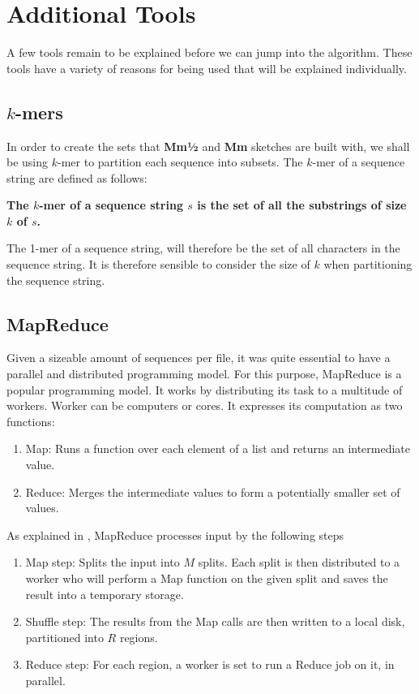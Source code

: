 \documentclass[../../main.tex]{subfiles}
\begin{document}
\section{Additional Tools}
A few tools remain to be explained before we can jump into the algorithm. These tools have a variety of reasons for being used that will be explained individually. 
\subsection{$k$-mers}
In order to create the sets that {\bf Mm½} and {\bf Mm} sketches are built with, we shall be using $k$-mer to partition each sequence into subsets. The $k$-mer of a sequence string are defined as follows:
\begin{center}
{\bf The $k$-mer of a sequence string $s$ is the set of all the substrings of size $k$ of $s$.}
\end{center}
The 1-mer of a sequence string, will therefore be the set of all characters in the sequence string. It is therefore sensible to consider the size of $k$ when partitioning the sequence string.
\subsection{MapReduce}
Given a sizeable amount of sequences per file, it was quite essential to have a parallel and distributed programming model. For this purpose, MapReduce is a popular programming model. It works by distributing its task to a multitude of workers. Worker can be computers or cores. It expresses its computation as two functions:
\begin{enumerate}
\item Map: Runs a function over each element of a list and returns an intermediate value.
\item Reduce: Merges the intermediate values to form a potentially smaller set of values.
\end{enumerate}

 As explained in \cite{mapreduceExplained}, MapReduce processes input by the following steps
\begin{enumerate}
\item Map step: Splits the input into $M$ splits. Each split is then distributed to a worker who will perform a Map function on the given split and saves the result into a temporary storage.
\item Shuffle step: The results from the Map calls are then written to a local disk, partitioned into $R$ regions.
\item Reduce step: For each region, a worker is set to run a Reduce job on it, in parallel.
\end{enumerate}
\end{document}
